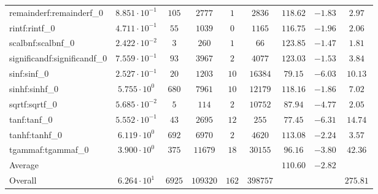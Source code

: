 \begin{tabular}{|l|c|c|c|c|c|c|c|c|}
remainderf:remainderf\_0     & $ 8.851 \cdot 10^{-1} $ & $ 105    $ & $ 2777   $ & $ 1   $ & $ 2836   $ & $ 118.62      $ & $ -1.83   $ & $ 2.97    $ \\
rintf:rintf\_0               & $ 4.711 \cdot 10^{-1} $ & $ 55     $ & $ 1039   $ & $ 0   $ & $ 1165   $ & $ 116.75      $ & $ -1.96   $ & $ 2.06    $ \\
scalbnf:scalbnf\_0           & $ 2.422 \cdot 10^{-2} $ & $ 3      $ & $ 260    $ & $ 1   $ & $ 66     $ & $ 123.85      $ & $ -1.47   $ & $ 1.81    $ \\
significandf:significandf\_0 & $ 7.559 \cdot 10^{-1} $ & $ 93     $ & $ 3967   $ & $ 2   $ & $ 4077   $ & $ 123.03      $ & $ -1.53   $ & $ 3.84    $ \\
sinf:sinf\_0                 & $ 2.527 \cdot 10^{-1} $ & $ 20     $ & $ 1203   $ & $ 10  $ & $ 16384  $ & $ 79.15       $ & $ -6.03   $ & $ 10.13   $ \\
sinhf:sinhf\_0               & $ 5.755 \cdot 10^{0}  $ & $ 680    $ & $ 7961   $ & $ 10  $ & $ 12179  $ & $ 118.16      $ & $ -1.86   $ & $ 7.02    $ \\
sqrtf:sqrtf\_0               & $ 5.685 \cdot 10^{-2} $ & $ 5      $ & $ 114    $ & $ 2   $ & $ 10752  $ & $ 87.94       $ & $ -4.77   $ & $ 2.05    $ \\
tanf:tanf\_0                 & $ 5.552 \cdot 10^{-1} $ & $ 43     $ & $ 2695   $ & $ 12  $ & $ 255    $ & $ 77.45       $ & $ -6.31   $ & $ 14.74   $ \\
tanhf:tanhf\_0               & $ 6.119 \cdot 10^{0}  $ & $ 692    $ & $ 6970   $ & $ 2   $ & $ 4620   $ & $ 113.08      $ & $ -2.24   $ & $ 3.57    $ \\
tgammaf:tgammaf\_0           & $ 3.900 \cdot 10^{0}  $ & $ 375    $ & $ 11679  $ & $ 18  $ & $ 30155  $ & $ 96.16       $ & $ -3.80   $ & $ 42.36   $ \\
\hline
Average                      & $                     $ & $        $ & $        $ & $     $ & $        $ & $ 110.60      $ & $ -2.82   $ & $         $ \\
\hline
Overall                      & $ 6.264 \cdot 10^{1}  $ & $ 6925   $ & $ 109320 $ & $ 162 $ & $ 398757 $ & $             $ & $         $ & $ 275.81  $ \\
\hline
\end{tabular}
